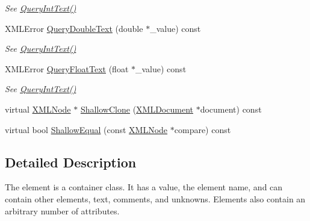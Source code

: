 \begin{DoxyCompactItemize}
\begin{DoxyCompactList}\small\item\em See \hyperlink{classtinyxml2_1_1_x_m_l_element_aa7c5d934a33df439c4e81533571c9267}{Query\-Int\-Text()} \end{DoxyCompactList}\item 
\hypertarget{classtinyxml2_1_1_x_m_l_element_aa6435954b9c868fb5cbab87a33d7a70d}{X\-M\-L\-Error \hyperlink{classtinyxml2_1_1_x_m_l_element_aa6435954b9c868fb5cbab87a33d7a70d}{Query\-Double\-Text} (double $\ast$\-\_\-value) const }\label{classtinyxml2_1_1_x_m_l_element_aa6435954b9c868fb5cbab87a33d7a70d}

\begin{DoxyCompactList}\small\item\em See \hyperlink{classtinyxml2_1_1_x_m_l_element_aa7c5d934a33df439c4e81533571c9267}{Query\-Int\-Text()} \end{DoxyCompactList}\item 
\hypertarget{classtinyxml2_1_1_x_m_l_element_a9191d7d6f5b6ef58236f9b14c1b4cdd0}{X\-M\-L\-Error \hyperlink{classtinyxml2_1_1_x_m_l_element_a9191d7d6f5b6ef58236f9b14c1b4cdd0}{Query\-Float\-Text} (float $\ast$\-\_\-value) const }\label{classtinyxml2_1_1_x_m_l_element_a9191d7d6f5b6ef58236f9b14c1b4cdd0}

\begin{DoxyCompactList}\small\item\em See \hyperlink{classtinyxml2_1_1_x_m_l_element_aa7c5d934a33df439c4e81533571c9267}{Query\-Int\-Text()} \end{DoxyCompactList}\item 
virtual \hyperlink{classtinyxml2_1_1_x_m_l_node}{X\-M\-L\-Node} $\ast$ \hyperlink{classtinyxml2_1_1_x_m_l_element_a4267351368d51803f98480981d622c00}{Shallow\-Clone} (\hyperlink{classtinyxml2_1_1_x_m_l_document}{X\-M\-L\-Document} $\ast$document) const 
\item 
virtual bool \hyperlink{classtinyxml2_1_1_x_m_l_element_aa4032d1d6b59a8392a1dc6a081618bbc}{Shallow\-Equal} (const \hyperlink{classtinyxml2_1_1_x_m_l_node}{X\-M\-L\-Node} $\ast$compare) const 
\end{DoxyCompactItemize}


\subsection{Detailed Description}
The element is a container class. It has a value, the element name, and can contain other elements, text, comments, and unknowns. Elements also contain an arbitrary number of attributes. 

